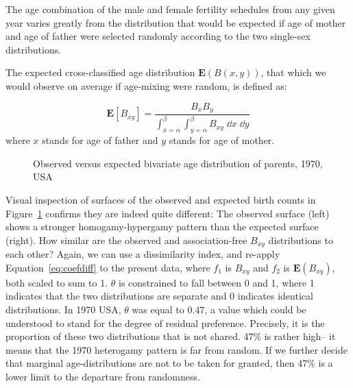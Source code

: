  \FloatBarrier
The age combination of the male and female fertility schedules from
any given year varies greatly from the distribution that would be expected if
age of mother and age of father were selected randomly according to the two
single-sex distributions.

The expected cross-classified age distribution $\textbf{E}(B(x,y))$, that which
we would observe on average if age-mixing were random, is defined as:

\begin{equation}
\label{eq:expected}
\textbf{E}\left[B_{xy}\right] = \frac{B_x B_y}{\int _{x = \alpha} ^\beta \int
_{y = \alpha} ^\beta B_{xy} \; \dd x \;\dd y}
\end{equation}
where $x$ stands for age of father and $y$ stands for age of mother.

\begin{figure}[ht!]
        \centering  
          \caption{Observed versus expected bivariate age distribution of
          parents, 1970, USA}
          \label{fig:US1970obsexp}
\end{figure}

Visual inspection of surfaces of the observed and expected birth counts in
Figure~\ref{fig:US1970obsexp} confirms they are indeed quite different: The
observed surface (left) shows a stronger homogamy-hypergamy pattern than the
expected surface (right). How similar are the
observed and association-free $B_{xy}$ distributions to each other? Again, we
can use a dissimilarity index, and re-apply Equation~\ref{eq:coefdiff} to the
present data, where $f_1$ is $B_{xy}$ and $f_2$ is $\textbf{E}(B_{xy})$, both scaled 
to sum to 1. $\theta$ is constrained to fall between 0 and 1, where 1 indicates that the
two distributions are separate and 0 indicates identical distributions. In 1970 USA,
$\theta$ was equal to $0.47$, a value which could be understood to stand for the
degree of residual preference. Precisely, it is the proportion of these two
distributions that is not shared. 47\% is rather high-- it means that the 1970
heterogamy pattern is far from random. If we further decide that marginal
age-distributions are not to be taken for granted, then 47\% is a lower limit to
the departure from randomness.

